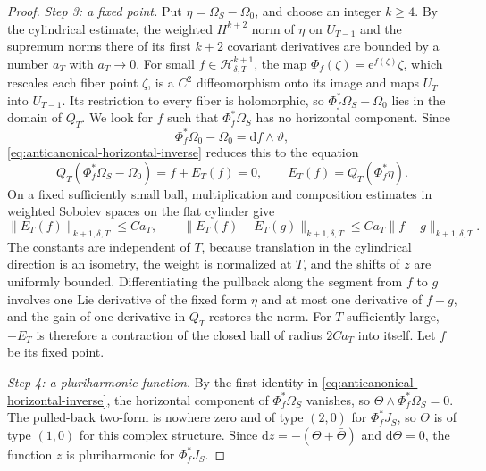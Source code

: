 \begin{proof}
\emph{Step 3: a fixed point.} Put $\eta=\Omega_S-\Omega_0$, and choose an integer $k\geq4$. By the cylindrical estimate, the weighted $H^{k+2}$ norm of $\eta$ on $U_{T-1}$ and the supremum norms there of its first $k+2$ covariant derivatives are bounded by a number $a_T$ with $a_T\to0$. For small $f\in\mathcal H^{k+1}_{\delta,T}$, the map $\Phi_f(\zeta)=\mathrm e^{f(\zeta)}\zeta$, which rescales each fiber point $\zeta$, is a $C^2$ diffeomorphism onto its image and maps $U_T$ into $U_{T-1}$. Its restriction to every fiber is holomorphic, so $\Phi_f^*\Omega_S-\Omega_0$ lies in the domain of $Q_T$. We look for $f$ such that $\Phi_f^*\Omega_S$ has no horizontal component. Since
\[
 \Phi_f^*\Omega_0-\Omega_0=\mathrm df\wedge\vartheta,
\]
\eqref{eq:anticanonical-horizontal-inverse} reduces this to the equation
\[
 Q_T(\Phi_f^*\Omega_S-\Omega_0)=f+E_T(f)=0,
 \qquad E_T(f)=Q_T(\Phi_f^*\eta).
\]
On a fixed sufficiently small ball, multiplication and composition estimates in weighted Sobolev spaces on the flat cylinder give
\[
 \|E_T(f)\|_{k+1,\delta,T}\leq Ca_T,\qquad
 \|E_T(f)-E_T(g)\|_{k+1,\delta,T}
 \leq Ca_T\|f-g\|_{k+1,\delta,T}.
\]
The constants are independent of $T$, because translation in the cylindrical direction is an isometry, the weight is normalized at $T$, and the shifts of $z$ are uniformly bounded. Differentiating the pullback along the segment from $f$ to $g$ involves one Lie derivative of the fixed form $\eta$ and at most one derivative of $f-g$, and the gain of one derivative in $Q_T$ restores the norm. For $T$ sufficiently large, $-E_T$ is therefore a contraction of the closed ball of radius $2Ca_T$ into itself. Let $f$ be its fixed point.

\emph{Step 4: a pluriharmonic function.} By the first identity in \eqref{eq:anticanonical-horizontal-inverse}, the horizontal component of $\Phi_f^*\Omega_S$ vanishes, so $\Theta\wedge\Phi_f^*\Omega_S=0$. The pulled-back two-form is nowhere zero and of type $(2,0)$ for $\Phi_f^*J_S$, so $\Theta$ is of type $(1,0)$ for this complex structure. Since $\mathrm dz=-(\Theta+\bar\Theta)$ and $\mathrm d\Theta=0$, the function $z$ is pluriharmonic for $\Phi_f^*J_S$.


\end{proof}
